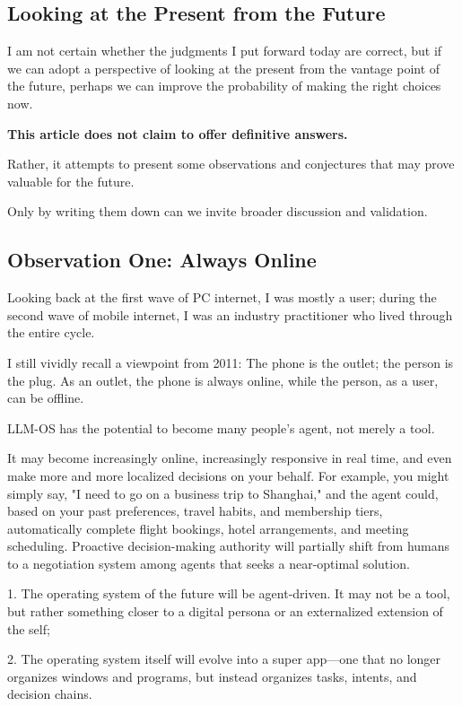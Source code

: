 \subsection*{Looking at the Present from the Future}

I am not certain whether the judgments I put forward today are correct, but if we can adopt a perspective of looking at the present from the vantage point of the future, perhaps we can improve the probability of making the right choices now.

\textbf{This article does not claim to offer definitive answers.}

Rather, it attempts to present some observations and conjectures that may prove valuable for the future.

Only by writing them down can we invite broader discussion and validation.

\subsection{Observation One: Always Online}

Looking back at the first wave of PC internet, I was mostly a user; during the second wave of mobile internet, I was an industry practitioner who lived through the entire cycle.

I still vividly recall a viewpoint from 2011:
{\kaiti
The phone is the outlet; the person is the plug. As an outlet, the phone is always online, while the person, as a user, can be offline.
}

LLM-OS has the potential to become many people's agent, not merely a tool.

It may become increasingly online, increasingly responsive in real time, and even make more and more localized decisions on your behalf.
For example, you might simply say, "I need to go on a business trip to Shanghai," and the agent could, based on your past preferences, travel habits, and membership tiers, automatically complete flight bookings, hotel arrangements, and meeting scheduling. Proactive decision-making authority will partially shift from humans to a negotiation system among agents that seeks a near-optimal solution.

\begin{thinkbox}
1. The operating system of the future will be agent-driven. It may not be a tool, but rather something closer to a digital persona or an externalized extension of the self;

2. The operating system itself will evolve into a super app---one that no longer organizes windows and programs, but instead organizes tasks, intents, and decision chains.
\end{thinkbox}

